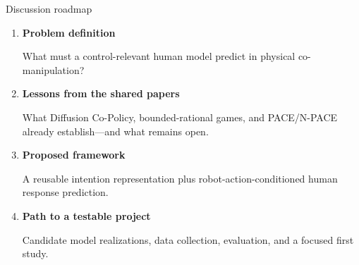 \documentclass[aspectratio=169,11pt]{beamer}
\begin{document}
\begin{frame}{Discussion roadmap}
\begin{enumerate}
  \item \textbf{Problem definition}\par
  What must a control-relevant human model predict in physical co-manipulation?
  \vspace{0.18cm}
  \item \textbf{Lessons from the shared papers}\par
  What Diffusion Co-Policy, bounded-rational games, and PACE/N-PACE already establish---and what remains open.
  \vspace{0.18cm}
  \item \textbf{Proposed framework}\par
  A reusable intention representation plus robot-action-conditioned human response prediction.
  \vspace{0.18cm}
  \item \textbf{Path to a testable project}\par
  Candidate model realizations, data collection, evaluation, and a focused first study.
\end{enumerate}
\end{frame}
\end{document}
